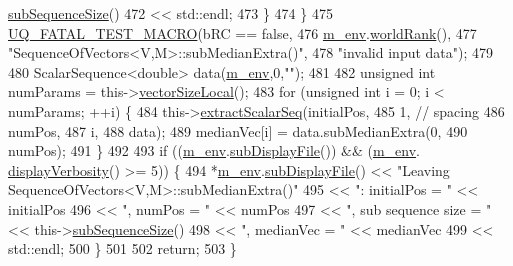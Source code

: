 \begin{DoxyCode}
      \hyperlink{class_q_u_e_s_o_1_1_sequence_of_vectors_a0224bd3e961d86af5d2886301c0c2b86}{subSequenceSize}()
472                               << std::endl;
473     \}
474   \}
475   \hyperlink{_defines_8h_a56d63d18d0a6d45757de47fcc06f574d}{UQ\_FATAL\_TEST\_MACRO}(bRC == \textcolor{keyword}{false},
476                       \hyperlink{class_q_u_e_s_o_1_1_base_vector_sequence_a8e8824d2a63c5a43bcc6473e3a0491e8}{m\_env}.\hyperlink{class_q_u_e_s_o_1_1_base_environment_a78b57112bbd0e6dd0e8afec00b40ffa7}{worldRank}(),
477                       \textcolor{stringliteral}{"SequenceOfVectors<V,M>::subMedianExtra()"},
478                       \textcolor{stringliteral}{"invalid input data"});
479 
480   ScalarSequence<double> data(\hyperlink{class_q_u_e_s_o_1_1_base_vector_sequence_a8e8824d2a63c5a43bcc6473e3a0491e8}{m\_env},0,\textcolor{stringliteral}{""});
481 
482   \textcolor{keywordtype}{unsigned} \textcolor{keywordtype}{int} numParams = this->\hyperlink{class_q_u_e_s_o_1_1_base_vector_sequence_a2fefedf9e5b90f22881103b3f92555f6}{vectorSizeLocal}();
483   \textcolor{keywordflow}{for} (\textcolor{keywordtype}{unsigned} \textcolor{keywordtype}{int} i = 0; i < numParams; ++i) \{
484     this->\hyperlink{class_q_u_e_s_o_1_1_sequence_of_vectors_ac977b3b26a6af2ae727671f1246262fd}{extractScalarSeq}(initialPos,
485                            1, \textcolor{comment}{// spacing}
486                            numPos,
487                            i,
488                            data);
489     medianVec[i] = data.subMedianExtra(0,
490                                        numPos);
491   \}
492 
493   \textcolor{keywordflow}{if} ((\hyperlink{class_q_u_e_s_o_1_1_base_vector_sequence_a8e8824d2a63c5a43bcc6473e3a0491e8}{m\_env}.\hyperlink{class_q_u_e_s_o_1_1_base_environment_a8a0064746ae8dddfece4229b9ad374d6}{subDisplayFile}()) && (\hyperlink{class_q_u_e_s_o_1_1_base_vector_sequence_a8e8824d2a63c5a43bcc6473e3a0491e8}{m\_env}.
      \hyperlink{class_q_u_e_s_o_1_1_base_environment_a1fe5f244fc0316a0ab3e37463f108b96}{displayVerbosity}() >= 5)) \{
494     *\hyperlink{class_q_u_e_s_o_1_1_base_vector_sequence_a8e8824d2a63c5a43bcc6473e3a0491e8}{m\_env}.\hyperlink{class_q_u_e_s_o_1_1_base_environment_a8a0064746ae8dddfece4229b9ad374d6}{subDisplayFile}() << \textcolor{stringliteral}{"Leaving SequenceOfVectors<V,M>::subMedianExtra()"}
495                            << \textcolor{stringliteral}{": initialPos = "}        << initialPos
496                            << \textcolor{stringliteral}{", numPos = "}            << numPos
497                            << \textcolor{stringliteral}{", sub sequence size = "} << this->\hyperlink{class_q_u_e_s_o_1_1_sequence_of_vectors_a0224bd3e961d86af5d2886301c0c2b86}{subSequenceSize}()
498                            << \textcolor{stringliteral}{", medianVec = "}         << medianVec
499                            << std::endl;
500   \}
501 
502   \textcolor{keywordflow}{return};
503 \}
\end{DoxyCode}
